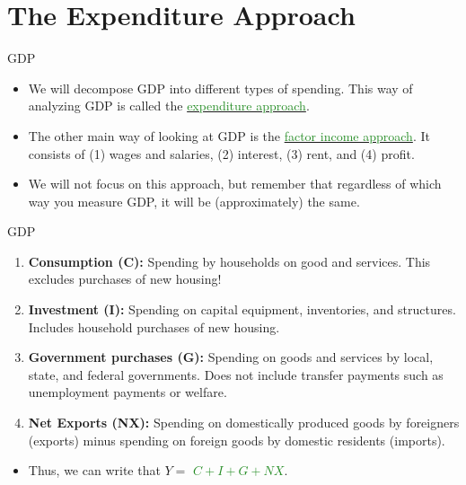 \documentclass[xcolor={dvipsnames},pdf, hyperref={colorlinks=true, citecolor=ForestGreen, linkcolor=BlueViolet, urlcolor=Magenta}]{beamer}
\theoremstyle{definition}
\newcommand{\dd}[1]{{\underline{\textcolor{ForestGreen}{#1}}}}
\begin{document}
\section{The Expenditure Approach}

\begin{frame}{GDP}
\begin{itemize}
	\item We will decompose GDP into different types of spending. This way of analyzing GDP is called the \dd{expenditure approach}.
	\item The other main way of looking at GDP is the \dd{factor income approach}. It consists of (1) wages and salaries, (2) interest, (3) rent, and (4) profit. 
	\item We will not focus on this approach, but remember that regardless of which way you measure GDP, it will be (approximately) the same.
\end{itemize}
\end{frame}

\begin{frame}{GDP}

\begin{enumerate}
		\item \textbf{Consumption (C):} Spending by households on good and services. This excludes purchases of new housing!
		\item \textbf{Investment (I):} Spending on capital equipment, inventories, and structures. Includes household purchases of new housing.
		\item \textbf{Government purchases (G):} Spending on goods and services by local, state, and federal governments. Does not include transfer payments such as unemployment payments or welfare.
		\item \textbf{Net Exports (NX):} Spending on domestically produced goods by foreigners (exports) minus spending on foreign goods by domestic residents (imports).
	\end{enumerate}
\begin{itemize}
	\item Thus, we can write that $Y = $ \dd{$C + I + G + NX$}.
\end{itemize}
\end{frame}
\end{document}
